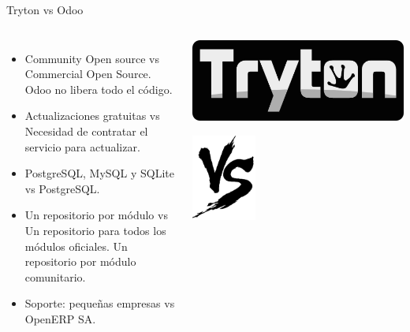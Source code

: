     \begin{frame}{Tryton vs Odoo}
        \fontsize{10}{11}\selectfont

        \begin{columns}
            \begin{itemize}
                \item Community Open source vs Commercial Open Source. Odoo no libera todo el código.
                \item Actualizaciones gratuitas vs Necesidad de contratar el servicio para actualizar.
                \item PostgreSQL, MySQL y SQLite vs PostgreSQL.
                \item Un repositorio por módulo vs Un repositorio para todos los módulos oficiales. Un repositorio por módulo comunitario.
                \item Soporte: pequeñas empresas vs OpenERP SA.
            \end{itemize}
            \vspace*{-1cm}
            \begin{center}
                \includegraphics[width=\textwidth]{./Images/Logos/tryton-name.jpg}

                \includegraphics[width=0.3\textwidth]{./Images/vs.png}


\end{center}
\end{columns}
\end{frame}
